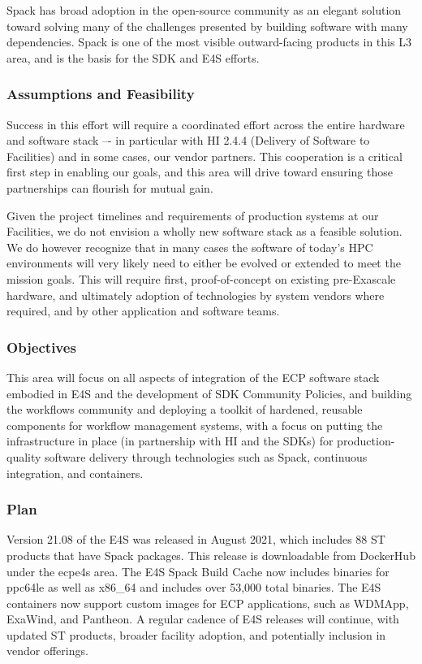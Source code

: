 Spack has broad adoption in the open-source community as an elegant solution toward solving many of the challenges presented by building software with many dependencies. Spack is one of the most visible outward-facing products in this L3 area, and is the basis for the SDK and E4S efforts.

\subsubsection{Assumptions and Feasibility}
Success in this effort will require a coordinated effort across the entire hardware and software stack –- in particular with HI 2.4.4 (Delivery of Software to Facilities) and in some cases, our vendor partners.  This cooperation is a critical first step in enabling our goals, and this area will drive toward ensuring those partnerships can flourish for mutual gain.

Given the project timelines and requirements of production systems at our Facilities, we do not envision a wholly new software stack as a feasible solution. We do however recognize that in many cases the software of today's HPC environments will very likely need to either be evolved or extended to meet the mission goals. This will require first, proof-of-concept on existing pre-Exascale hardware, and ultimately adoption of technologies by system vendors where required, and by other application and software teams.

\subsubsection{Objectives}
This area will focus on all aspects of integration of the ECP software stack embodied in E4S and the development of SDK Community Policies, and building the workflows community and deploying a toolkit of hardened, reusable components for workflow management systems, with a focus on putting the infrastructure in place (in partnership with HI and the SDKs) for production-quality software delivery through technologies such as Spack, continuous integration, and containers. 

\subsubsection{Plan}
Version 21.08 of the E4S was released in August 2021, which includes 88 ST products that have Spack packages. This release is downloadable from DockerHub under the ecpe4s area.  The E4S Spack Build Cache now includes binaries for ppc64le as well as x86\_64 and includes over 53,000 total binaries.  The E4S containers now support custom images for ECP applications, such as WDMApp, ExaWind, and Pantheon.  A regular cadence of E4S releases will continue, with updated ST products, broader facility adoption, and potentially inclusion in vendor offerings.


